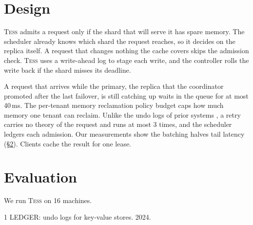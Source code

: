 \documentclass{article}
\newcommand{\Sys}{\textsc{Tess}}
\begin{document}
\section{Design}
\label{sec:design}
\Sys{} admits a request only if the shard that will serve it has spare memory.
The scheduler already knows which shard the request reaches,
    so it decides on the replica itself.
A request that changes nothing the cache covers skips the admission check.
\Sys{} uses a write-ahead log to stage each write,
    and the controller rolls the write back if the shard misses its deadline.

A request that arrives while the primary,
    the replica that the coordinator promoted after the last failover,
    is still catching up waits in the queue for at most 40\,ms.
The per-tenant memory reclamation policy budget caps how much memory one tenant can reclaim.
Unlike the undo logs of prior systems \cite{ledger2024},
    a retry carries no theory of the request and runs at most 3 times,
    and the scheduler ledgers each admission.
Our measurements show the batching halves tail latency (\S\ref{sec:eval}).
Clients cache the result for one lease.

\section{Evaluation}
\label{sec:eval}
We run \Sys{} on 16 machines.

\begin{thebibliography}{1}
 LEDGER: undo logs for key-value stores. 2024.
\end{thebibliography}
\end{document}
